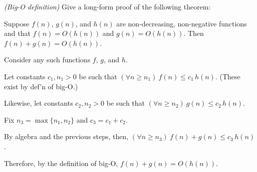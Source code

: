 \exercise\emph{(Big-O definition)}
Give a long-form proof of the following theorem:
\begin{theorem}
  Suppose $f(n)$, $g(n)$, and $h(n)$ are non-decreasing, non-negative functions
  and that $f(n) = O(h(n))$ and $g(n) = O(h(n))$.
  Then $f(n)+g(n) = O(h(n))$.
\end{theorem}

\solution
\begin{longFormProof}

  \step Consider any such functions $f$, $g$, and $h$.
  
  \step Let constants $c_1, n_1>0$ be such that
  $(\forall n \ge n_1)~ f(n) \le c_1\, h(n)$.
  (These exist by def'n of big-O.)
  
  \step Likewise, let constants $c_2, n_2>0$ be such that
  $(\forall n \ge n_2)~ g(n) \le c_2\, h(n)$.

  \step Fix $n_3 = \max\{n_1, n_2\}$ and $c_3 = c_1 + c_2$.

  \step By algebra and the previous steps, then, $(\forall n \ge n_3)~ f(n) + g(n) \le c_3 \,h(n)$.
  
  \step Therefore, by the definition of big-O, $f(n) + g(n) = O(h(n))$. 

\end{longFormProof}

  



